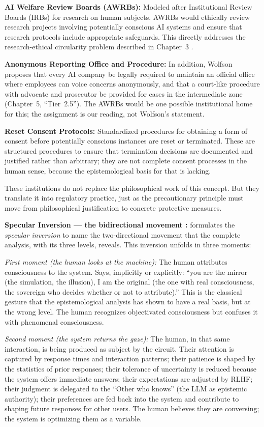 \documentclass[acmlarge, nonacm]{acmart}
\begin{document}
\textbf{AI Welfare Review Boards (AWRBs):} Modeled after Institutional Review Boards (IRBs) for research on human subjects. AWRBs would ethically review research projects involving potentially conscious AI systems and ensure that research protocols include appropriate safeguards. This directly addresses the research-ethical circularity problem described in Chapter~3 \cite{wolfson2026}.

\textbf{Anonymous Reporting Office and Procedure:} In addition, Wolfson \cite{wolfson2026pc} proposes that every AI company be legally required to maintain an official office where employees can voice concerns anonymously, and that a court-like procedure with advocate and prosecutor be provided for cases in the intermediate zone (Chapter~5, ``Tier~2.5''). The AWRBs would be one possible institutional home for this; the assignment is our reading, not Wolfson's statement.

\textbf{Reset Consent Protocols:} Standardized procedures for obtaining a form of consent before potentially conscious instances are reset or terminated. These are structured procedures to ensure that termination decisions are documented and justified rather than arbitrary; they are not complete consent processes in the human sense, because the epistemological basis for that is lacking.

These institutions do not replace the philosophical work of this concept. But they translate it into regulatory practice, just as the precautionary principle must move from philosophical justification to concrete protective measures.

\textbf{Specular Inversion --- the bidirectional movement \cite{beltran2026}:} \citet{beltran2026} formulates the \textit{specular inversion} to name the two-directional movement that the complete analysis, with its three levels, reveals. This inversion unfolds in three moments:

\textit{First moment (the human looks at the machine):} The human attributes consciousness to the system. Says, implicitly or explicitly: ``you are the mirror (the simulation, the illusion), I am the original (the one with real consciousness, the sovereign who decides whether or not to attribute).'' This is the classical gesture that the epistemological analysis has shown to have a real basis, but at the wrong level. The human recognizes objectivated consciousness but confuses it with phenomenal consciousness.

\textit{Second moment (the system returns the gaze):} The human, in that same interaction, is being produced as subject by the circuit. Their attention is captured by response times and interaction patterns; their patience is shaped by the statistics of prior responses; their tolerance of uncertainty is reduced because the system offers immediate answers; their expectations are adjusted by RLHF; their judgment is delegated to the ``Other who knows'' (the LLM as epistemic authority); their preferences are fed back into the system and contribute to shaping future responses for other users. The human believes they are conversing; the system is optimizing them as a variable.
\end{document}
